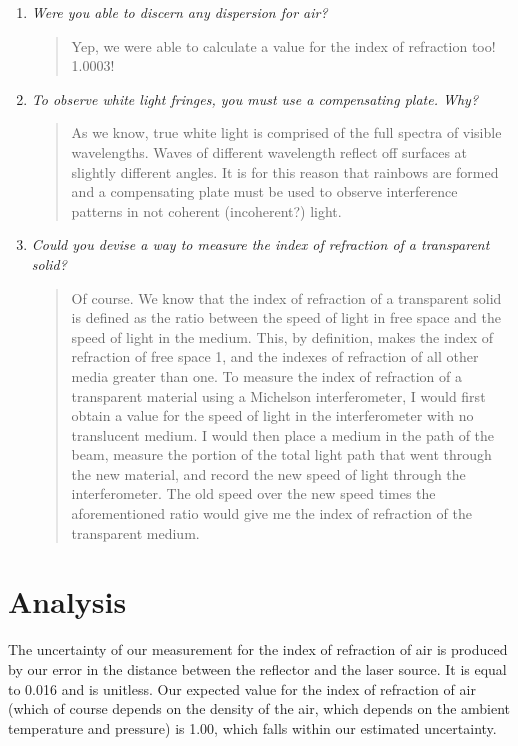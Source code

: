 \documentclass{amsart}
\begin{document}
\begin{enumerate}
\item {\textit{Were you able to discern any dispersion for air?}
\begin{quote}
    Yep, we were able to calculate a value for the index of refraction too! 1.0003!
\end{quote}}

\item{\textit{To observe white light fringes, you must use a compensating plate. Why?}
\begin{quote}
    As we know, true white light is comprised of the full spectra of visible wavelengths. Waves of different wavelength reflect off surfaces at slightly different angles. It is for this reason that rainbows are formed and a compensating plate must be used to observe interference patterns in not coherent (incoherent?) light.
\end{quote}}

\item{\textit{Could you devise a way to measure the index of refraction of a transparent solid?}
\begin{quote}
    Of course. We know that the index of refraction of a transparent solid is defined as the ratio between the speed of light in free space and the speed of light in the medium. This, by definition, makes the index of refraction of free space 1, and the indexes of refraction of all other media greater than one. To measure the index of refraction of a transparent material using a Michelson interferometer, I would first obtain a value for the speed of light in the interferometer with no translucent medium. I would then place a medium in the path of the beam, measure the portion of the total light path that went through the new material, and record the new speed of light through the interferometer. The old speed over the new speed times the aforementioned ratio would give me the index of refraction of the transparent medium.
\end{quote}}

\end{enumerate}

\section{Analysis}
The uncertainty of our measurement for the index of refraction of air is produced by our error in the distance between the reflector and the laser source. It is equal to 0.016 and is unitless. Our expected value for the index of refraction of air (which of course depends on the density of the air, which depends on the ambient temperature and pressure) is 1.00, which falls within our estimated uncertainty. \\
\end{document}
